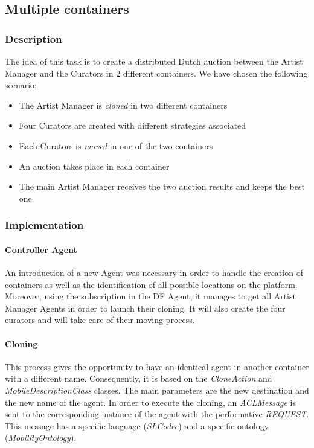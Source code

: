 \documentclass[a4paper,11pt]{article}
\begin{document}

  \subsection{Multiple containers}

  \subsubsection{Description}

  The idea of this task is to create a distributed Dutch auction between the Artist Manager
  and the Curators in 2 different containers.
  We have chosen the following scenario:
  \begin{itemize}
  \item The Artist Manager is \textit{cloned} in two different containers
  \item Four Curators are created with different strategies associated
  \item Each Curators is \textit{moved} in one of the two containers 
  \item An auction takes place in each container
  \item The main Artist Manager receives the two auction results and keeps the best one
  \end{itemize}

  \subsubsection{Implementation}

  \paragraph{Controller Agent}

  An introduction of a new Agent was necessary in order to handle the creation of containers
  as well as the identification of all possible locations on the platform. Moreover, using the
  subscription in the DF Agent, it manages to get all Artist Manager Agents in order to
  launch their cloning. It will also create the four curators and will take care of their
  moving process.

  \paragraph{Cloning}

  This process gives the opportunity to have an identical agent in another container with a different
  name. Consequently, it is based on the \textit{CloneAction} and \textit{MobileDescriptionClass} classes.
  The main parameters are the new destination and the new name of the agent.
  In order to execute the cloning, an \textit{ACLMessage} is sent to the corresponding instance of the agent
  with the performative \textit{REQUEST}. This message has a specific language (\textit{SLCodec}) and a specific
  ontology (\textit{MobilityOntology}).
\end{document}
